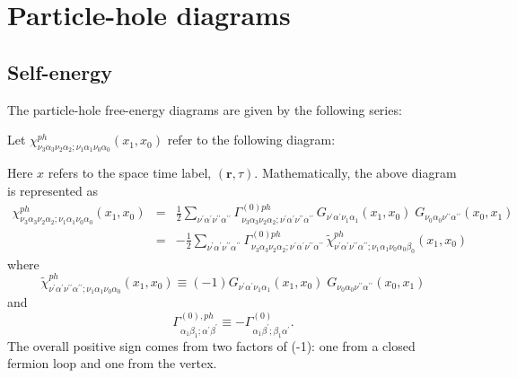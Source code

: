 \chapter{Particle-hole diagrams}
\label{chapter:particle-hole}

\section{Self-energy}
The particle-hole free-energy diagrams are given by
the following series:

\begin{center}
\end{center}

Let $\chi^{ph}_{\nu_3\alpha_3 \nu_2 \alpha_2; 
\nu_1\alpha_1 \nu_0\alpha_0}(x_1,x_0)$ refer
to the following diagram:

\begin{center}
\end{center}

Here $x$ refers to the space time label, $(\mathbf{r},\tau)$.
Mathematically, the above diagram is represented as
\begin{eqnarray}
\label{k_ph}
\chi^{ph}_{\nu_3\alpha_3 \nu_2 \alpha_2; \nu_1 \alpha_1 \nu_0\alpha_0}(x_1,x_0) 
& = & \frac{1}{2} \sum_{\nu^{\prime}\alpha^{\prime}\nu^{\prime\prime} \alpha^{\prime\prime}}
\Gamma^{(0)ph}_{\nu_3\alpha_3\nu_2\alpha_2; 
\nu^{\prime}\alpha^{\prime}\nu^{\prime\prime}\alpha^{\prime\prime}}\,
G_{\nu^{\prime}\alpha^{\prime}\nu_1 \alpha_1}(x_1,x_0) \; G_{\nu_0\alpha_0 
\nu^{\prime\prime}\alpha^{\prime\prime}}(x_0,x_1) \\
& = & -\frac{1}{2}\sum_{\nu^{\prime}\alpha^{\prime}\nu^{\prime\prime} \alpha^{\prime\prime}} 
\Gamma^{(0)ph}_{\nu_3\alpha_3 \nu_2 \alpha_2; \nu^{\prime}\alpha^{\prime}
\nu^{\prime\prime}\alpha^{\prime\prime}}\,
\tilde{\chi}^{ph}_{\nu^{\prime}\alpha^{\prime}\nu^{\prime\prime} \alpha^{\prime\prime}; 
\nu_1\alpha_1\nu_0\alpha_0 \beta_0}(x_1,x_0)
\end{eqnarray}
where
\begin{equation}
\label{chi_ph}
\tilde{\chi}^{ph}_{\nu^{\prime}\alpha^{\prime}\nu^{\prime\prime}\alpha^{\prime\prime}; 
\nu_1\alpha_1 \nu_0\alpha_0}(x_1,x_0) \equiv
(-1) G_{\nu^{\prime}\alpha^{\prime}\nu_1 \alpha_1}(x_1,x_0) \; 
G_{\nu_0\alpha_0 \nu^{\prime\prime}\alpha^{\prime\prime}}(x_0,x_1)
\end{equation}
and
\begin{equation}
\Gamma^{(0),ph}_{\alpha_1 \beta_1; \alpha^{\prime}\beta^{\prime}} \equiv
- \Gamma^{(0)}_{\alpha_1 \beta^{\prime}; \beta_1 \alpha^{\prime}}.
\end{equation}
The overall positive sign comes from two factors of (-1):
one from a closed fermion loop and one from the vertex.

